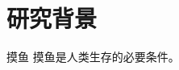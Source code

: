 
\section{研究背景}
\label{sec:background}

\begin{comment}
背景介绍尽量简练，2-3页为宜，但信息量要足。
目的是给出研究背景（对应选题意义）、现状，总结当前工作的不足，从而引出自己的工作。 
\end{comment}

\begin{frame}{摸鱼}
  摸鱼是人类生存的必要条件\cite{Karras2019AnalyzingAI,Heusel2017GANsTB}。
\end{frame}

